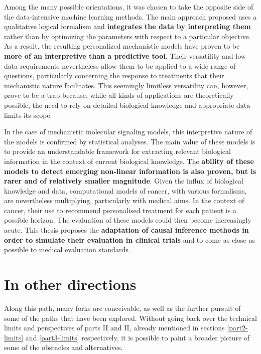 \documentclass[a4paper,12pt,twoside,onecolumn,openright,final,oldfontcommands]{memoir}
\begin{document}
Among the many possible orientations, it was chosen to take the opposite
side of the data-intensive machine learning methods. The main approach
proposed uses a qualitative logical formalism and \textbf{integrates the
data by interpreting them} rather than by optimizing the parameters with
respect to a particular objective. As a result, the resulting
personalized mechanistic models have proven to be \textbf{more of an
interpretive than a predictive tool}. Their versatility and low data
requirements nevertheless allow them to be applied to a wide range of
questions, particularly concerning the response to treatments that their
mechanistic nature facilitates. This seemingly limitless versatility
can, however, prove to be a trap because, while all kinds of
applications are theoretically possible, the need to rely on detailed
biological knowledge and appropriate data limits its scope.

In the case of mechanistic molecular signaling models, this interpretive
nature of the models is confirmed by statistical analyses. The main
value of these models is to provide an understandable framework for
extracting relevant biological information in the context of current
biological knowledge. The \textbf{ability of these models to detect
emerging non-linear information is also proven, but is rarer and of
relatively smaller magnitude}. Given the influx of biological knowledge
and data, computational models of cancer, with various formalisms, are
nevertheless multiplying, particularly with medical aims. In the context
of cancer, their use to recommend personalised treatment for each
patient is a possible horizon. The evaluation of these models could then
become increasingly acute. This thesis proposes the \textbf{adaptation
of causal inference methods in order to simulate their evaluation in
clinical trials} and to come as close as possible to medical evaluation
standards.

\section*{In other directions}\label{in-other-directions}

Along this path, many forks are conceivable, as well as the further
pursuit of some of the paths that have been explored. Without going back
over the technical limits and perspectives of parts II and II, already
mentioned in sections \ref{part2-limits} and \ref{part3-limits}
respectively, it is possible to paint a broader picture of some of the
obstacles and alternatives.
\end{document}
